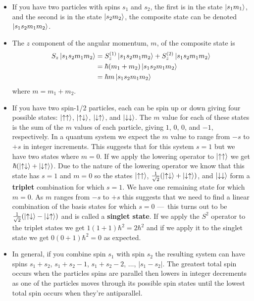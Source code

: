 \documentclass{article}
\begin{document}
\begin{itemize}
  \item If you have two particles with spins $s_1$ and $s_2$, the first is in the state $\ket{s_1 m_1}$, and the second is in the state $\ket{s_2 m_2}$, the composite state can be denoted $\ket{s_1 s_2 m_1 m_2}$.

  \item The $z$ component of the angular momentum, $m$, of the composite state is \begin{align*}
          S_z \ket{s_1 s_2 m_1 m_2} & = S_z^{(1)} \ket{s_1 s_2 m_1 m_2} + S_z^{(2)} \ket{s_1 s_2 m_1 m_2} \\
                                    & = \hbar (m_1 + m_2) \ket{s_1 s_2 m_1 m_2}                           \\
                                    & = \hbar m \ket{s_1 s_2 m_1 m_2}
        \end{align*} where $m = m_1 + m_2$.

  \item If you have two spin-1/2 particles, each can be spin up or down giving four possible states: $\ket{\uparrow \uparrow}$, $\ket{\uparrow \downarrow}$, $\ket{\downarrow \uparrow}$, and $\ket{\downarrow \downarrow}$. The $m$ value for each of these states is the sum of the $m$ values of each particle, giving $1$, $0$, $0$, and $-1$, respectively. In a quantum system we expect the $m$ value to range from $-s$ to $+s$ in integer increments. This suggests that for this system $s = 1$ but we have two states where $m = 0$. If we apply the lowering operator to $\ket{\uparrow \uparrow}$ we get $\hbar (\ket{\uparrow \downarrow} + \ket{\downarrow \uparrow})$. Due to the nature of the lowering operator we know that this state has $s = 1$ and $m = 0$ so the states $\ket{\uparrow \uparrow}$, $\frac{1}{\sqrt{2}} (\ket{\uparrow \downarrow} + \ket{\downarrow \uparrow})$, and $\ket{\downarrow \downarrow}$ form a \textbf{triplet} combination for which $s = 1$. We have one remaining state for which $m = 0$. As $m$ ranges from $-s$ to $+s$ this suggests that we need to find a linear combination of the basis states for which $s = 0$ — this turns out to be $\frac{1}{\sqrt{2}} (\ket{\uparrow \downarrow} - \ket{\downarrow \uparrow})$ and is called a \textbf{singlet state}. If we apply the $S^2$ operator to the triplet states we get $1 (1 + 1) \hbar^2 = 2 \hbar^2$ and if we apply it to the singlet state we get $0 (0 + 1) \hbar^2 = 0$ as expected.

  \item In general, if you combine spin $s_1$ with spin $s_2$ the resulting system can have spins $s_1 + s_2$, $s_1 + s_2 - 1$, $s_1 + s_2 - 2$, $\ldots$, $|s_1 - s_2|$. The greatest total spin occurs when the particles spins are parallel then lowers in integer decrements as one of the particles moves through its possible spin states until the lowest total spin occurs when they're antiparallel.


\end{itemize}
\end{document}
